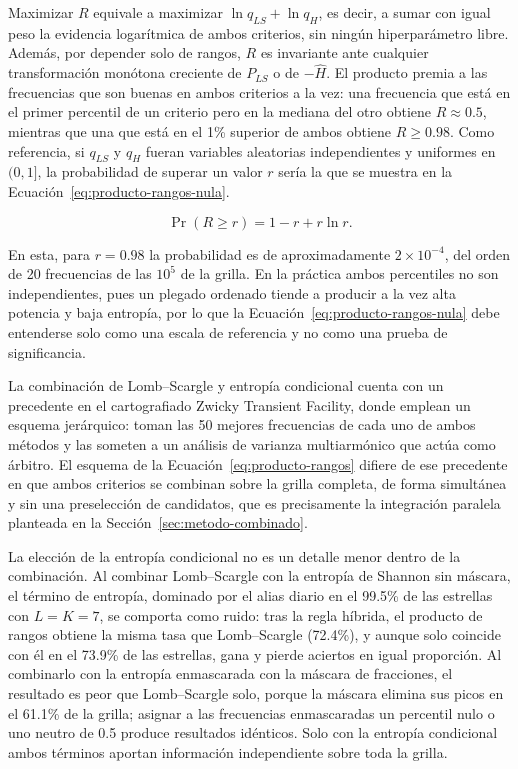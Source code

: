 \documentclass[12pt,letterpaper,oneside]{book}
\begin{document}
Maximizar $R$ equivale a maximizar $\ln q_{LS}+\ln q_H$, es decir, a sumar con igual peso la evidencia logar\'itmica de ambos criterios, sin ning\'un hiperpar\'ametro libre. Adem\'as, por depender solo de rangos, $R$ es invariante ante cualquier transformaci\'on mon\'otona creciente de $P_{LS}$ o de $-\hat H$. El producto premia a las frecuencias que son buenas en ambos criterios a la vez: una frecuencia que est\'a en el primer percentil de un criterio pero en la mediana del otro obtiene $R\approx0.5$, mientras que una que est\'a en el 1\% superior de ambos obtiene $R\geq0.98$. Como referencia, si $q_{LS}$ y $q_H$ fueran variables aleatorias independientes y uniformes en $(0,1]$, la probabilidad de superar un valor $r$ ser\'ia la que se muestra en la Ecuaci\'on~\eqref{eq:producto-rangos-nula}.

\begin{equation}
	\Pr(R \geq r) = 1 - r + r\ln r.
	\label{eq:producto-rangos-nula}
\end{equation}

En esta, para $r=0.98$ la probabilidad es de aproximadamente $2\times10^{-4}$, del orden de 20 frecuencias de las $10^5$ de la grilla. En la pr\'actica ambos percentiles no son independientes, pues un plegado ordenado tiende a producir a la vez alta potencia y baja entrop\'ia, por lo que la Ecuaci\'on~\eqref{eq:producto-rangos-nula} debe entenderse solo como una escala de referencia y no como una prueba de significancia.

La combinaci\'on de Lomb--Scargle y entrop\'ia condicional cuenta con un precedente en el cartografiado Zwicky Transient Facility, donde \citet{Coughlin2021} emplean un esquema jer\'arquico: toman las 50 mejores frecuencias de cada uno de ambos m\'etodos y las someten a un an\'alisis de varianza multiarm\'onico que act\'ua como \'arbitro. El esquema de la Ecuaci\'on~\eqref{eq:producto-rangos} difiere de ese precedente en que ambos criterios se combinan sobre la grilla completa, de forma simult\'anea y sin una preselecci\'on de candidatos, que es precisamente la integraci\'on paralela planteada en la Secci\'on~\ref{sec:metodo-combinado}.

La elecci\'on de la entrop\'ia condicional no es un detalle menor dentro de la combinaci\'on. Al combinar Lomb--Scargle con la entrop\'ia de Shannon sin m\'ascara, el t\'ermino de entrop\'ia, dominado por el alias diario en el 99.5\% de las estrellas con $L=K=7$, se comporta como ruido: tras la regla h\'ibrida, el producto de rangos obtiene la misma tasa que Lomb--Scargle (72.4\%), y aunque solo coincide con \'el en el 73.9\% de las estrellas, gana y pierde aciertos en igual proporci\'on. Al combinarlo con la entrop\'ia enmascarada con la m\'ascara de fracciones, el resultado es peor que Lomb--Scargle solo, porque la m\'ascara elimina sus picos en el 61.1\% de la grilla; asignar a las frecuencias enmascaradas un percentil nulo o uno neutro de 0.5 produce resultados id\'enticos. Solo con la entrop\'ia condicional ambos t\'erminos aportan informaci\'on independiente sobre toda la grilla.
\end{document}
